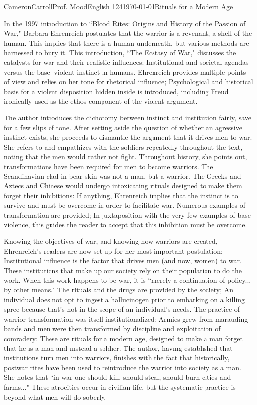 \documentclass[12pt,letterpaper]{article}
\begin{document}
\begin{mla}{Cameron}{Carroll}{Prof. Mood}{English 124}{\today}{Rituals for a Modern Age}


In the 1997 introduction to ``Blood Rites: Origins and History of the Passion of War," Barbara Ehrenreich postulates that the warrior is a revenant, a shell of the human. This implies that there is a human underneath, but various methods are harnessed to bury it. This introduction, ``The Ecstasy of War," discusses the catalysts for war and their realistic influences: Institutional and societal agendas versus the base, violent instinct in humans. Ehrenreich provides multiple points of view and relies on her tone for rhetorical influence; Psychological and historical basis for a violent disposition hidden inside is introduced, including Freud ironically used as the ethos component of the violent argument. 

The author introduces the dichotomy between instinct and institution fairly, save for a few slips of tone. After setting aside the question of whether an agressive instinct exists, she proceeds to dismantle the argument that it drives men to war. She refers to and empathizes with the soldiers repeatedly throughout the text, noting that the men would rather not fight. Throughout history, she points out, transformations have been required for men to become warriors. The Scandinavian clad in bear skin was not a man, but a warrior. The Greeks and Aztecs and Chinese would undergo intoxicating rituals designed to make them forget their inhibitions: If anything, Ehrenreich implies that the instinct is to survive and must be overcome in order to facilitate war. Numerous examples of transformation are provided; In juxtaposition with the very few examples of base violence, this guides the reader to accept that this inhibition must be overcome.

Knowing the objectives of war, and knowing how warriors are created, Ehrenreich's readers are now set up for her most important postulation: Institutional influence is the factor that drives men (and now, women) to war. These institutions that make up our society rely on their population to do the work. When this work happens to be war, it is ``merely a continuation of policy... by other means." The rituals and the drugs are provided by the society; An individual does not opt to ingest a hallucinogen prior to embarking on a killing spree because that's not in the scope of an individual's needs. The practice of warrior transformation was itself institutionalized: Armies grew from marauding bands and men were then transformed by discipline and exploitation of comradery: These are rituals for a modern age, designed to make a man forget that he is a man and instead a soldier. The author, having established that institutions turn men into warriors, finishes with the fact that historically, postwar rites have been used to reintroduce the warrior into society as a man. She notes that ``in war one should kill, should steal, should burn cities and farms..." These atrocities occur in civilian life, but the systematic practice is beyond what men will do soberly.



\end{mla}
\end{document}
